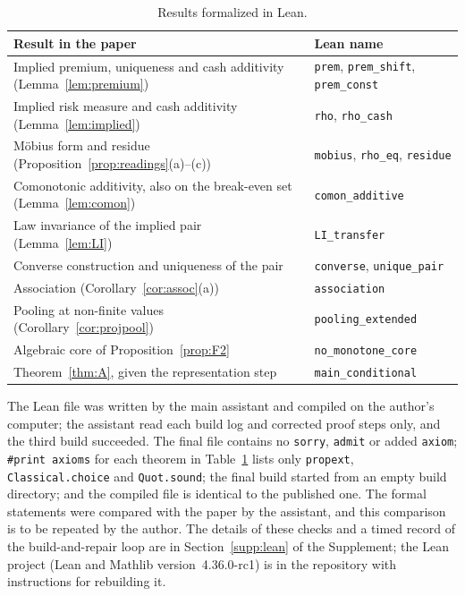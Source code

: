 \begin{table}[ht]
\centering\small
\begin{tabular}{@{}ll@{}}
\toprule
\textbf{Result in the paper} & \textbf{Lean name}\\
\midrule
Implied premium, uniqueness and cash additivity (Lemma~\ref{lem:premium}) & \texttt{prem}, \texttt{prem\_shift}, \texttt{prem\_const}\\
Implied risk measure and cash additivity (Lemma~\ref{lem:implied}) & \texttt{rho}, \texttt{rho\_cash}\\
Möbius form and residue (Proposition~\ref{prop:readings}(a)--(c)) & \texttt{mobius}, \texttt{rho\_eq}, \texttt{residue}\\
Comonotonic additivity, also on the break-even set (Lemma~\ref{lem:comon}) & \texttt{comon\_additive}\\
Law invariance of the implied pair (Lemma~\ref{lem:LI}) & \texttt{LI\_transfer}\\
Converse construction and uniqueness of the pair & \texttt{converse}, \texttt{unique\_pair}\\
Association (Corollary~\ref{cor:assoc}(a)) & \texttt{association}\\
Pooling at non-finite values (Corollary~\ref{cor:projpool}) & \texttt{pooling\_extended}\\
Algebraic core of Proposition~\ref{prop:F2} & \texttt{no\_monotone\_core}\\
Theorem~\ref{thm:A}, given the representation step & \texttt{main\_conditional}\\
\bottomrule
\end{tabular}
\caption{Results formalized in Lean.}\label{tab:lean}
\end{table}

The Lean file was written by the main assistant and compiled on the author's computer; the assistant read each
build log and corrected proof steps only, and the third build succeeded. The final file contains no \texttt{sorry},
\texttt{admit} or added \texttt{axiom}; \texttt{\#print axioms} for each theorem in Table~\ref{tab:lean} lists only
\texttt{propext}, \texttt{Classical.choice} and \texttt{Quot.sound}; the final build started from an empty build
directory; and the compiled file is identical to the published one. The formal statements were compared with the
paper by the assistant, and this comparison is to be repeated by the author. The details of these checks and a timed
record of the build-and-repair loop are in Section~\ref{supp:lean} of the Supplement; the Lean project (Lean and
Mathlib version~4.36.0-rc1) is in the repository with instructions for rebuilding it.
